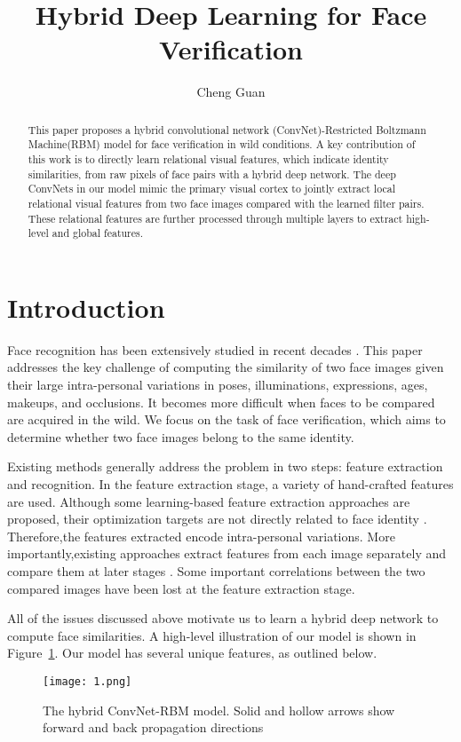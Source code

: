 \documentclass[10pt,twocolumn,letterpaper]{article}
\title{\textbf{Hybrid Deep Learning for Face Verification}}
\author{Cheng Guan}
\begin{document}
\maketitle
\begin{abstract}
This paper proposes a hybrid convolutional network (ConvNet)-Restricted Boltzmann Machine(RBM) model for face verification in wild conditions. A key contribution of this work is to directly learn relational visual features, which indicate identity similarities, from raw pixels of face pairs with a hybrid deep network. The deep ConvNets in our model mimic the primary visual cortex to jointly extract local relational visual features from two face images compared with the learned filter pairs. These relational features are further processed through multiple layers to extract high-level and global features.
\end{abstract}
\section{\textbf{Introduction}}
Face recognition has been extensively studied in recent decades \cite{Framework2004,Linear2004,Atttibute2009}. This paper addresses the key challenge of computing the similarity of two face images given their large intra-personal variations in poses, illuminations, expressions, ages, makeups, and occlusions. It becomes more difficult when faces to be compared are acquired in the wild. We focus on the task of face verification, which aims to determine whether two face images belong to the same identity.
\par
Existing methods generally address the problem in two steps: feature extraction and recognition. In the feature extraction stage, a variety of hand-crafted features are used. Although some learning-based feature extraction approaches are proposed, their optimization targets are not directly related to face identity \cite{Face2010}. Therefore,the features extracted encode intra-personal variations. More importantly,existing approaches extract features from each image separately and compare them at later stages . Some important correlations between the two compared images have been lost at the feature extraction stage.
\par
All of the issues discussed above motivate us to learn a hybrid deep network to compute face similarities. A high-level illustration of our model is shown in Figure~\ref{fig1}. Our model has several unique features, as outlined below.
\par
\begin{figure}[htbp]
  \centering
  \texttt{[image: 1.png]}\\
  \caption{The hybrid ConvNet-RBM model. Solid and hollow arrows show forward and back propagation directions}\label{fig1}
\end{figure}
\end{document}
